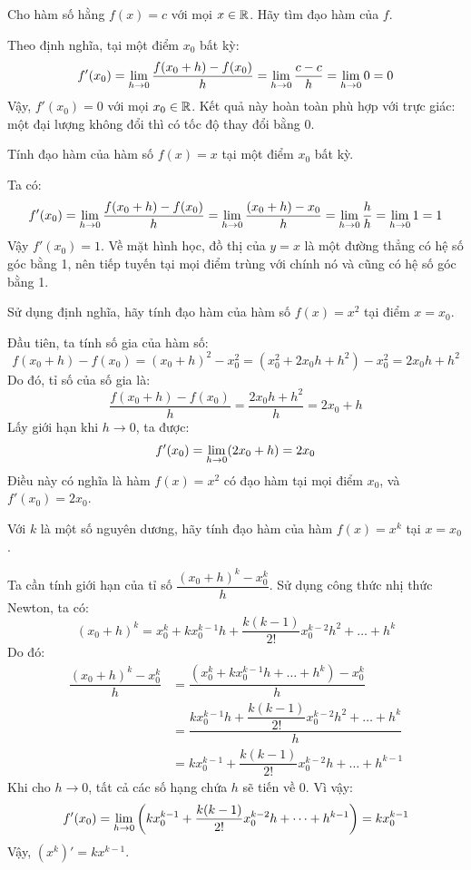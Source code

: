 \begin{example}
Cho hàm số hằng $f(x) = c$ với mọi $x \in \mathbb{R}$. Hãy tìm đạo hàm của $f$.
\end{example}
\begin{solution}
Theo định nghĩa, tại một điểm $x_0$ bất kỳ:
$$
f'(x_0) = \lim\limits_{h \to 0} \dfrac{f(x_0 + h) - f(x_0)}{h} = \lim\limits_{h \to 0} \dfrac{c - c}{h} = \lim\limits_{h \to 0} 0 = 0
$$
Vậy, $f'(x_0) = 0$ với mọi $x_0 \in \mathbb{R}$. Kết quả này hoàn toàn phù hợp với trực giác: một đại lượng không đổi thì có tốc độ thay đổi bằng 0.
\end{solution}

\begin{example}
Tính đạo hàm của hàm số $f(x) = x$ tại một điểm $x_0$ bất kỳ.
\end{example}
\begin{solution}
Ta có:
$$
f'(x_0) = \lim\limits_{h \to 0} \dfrac{f(x_0 + h) - f(x_0)}{h} = \lim\limits_{h \to 0} \dfrac{(x_0 + h) - x_0}{h} = \lim\limits_{h \to 0} \dfrac{h}{h} = \lim\limits_{h \to 0} 1 = 1
$$
Vậy $f'(x_0) = 1$. Về mặt hình học, đồ thị của $y=x$ là một đường thẳng có hệ số góc bằng 1, nên tiếp tuyến tại mọi điểm trùng với chính nó và cũng có hệ số góc bằng 1.
\end{solution}

\begin{example}
Sử dụng định nghĩa, hãy tính đạo hàm của hàm số $f(x) = x^2$ tại điểm $x=x_0$.
\end{example}
\begin{solution}
Đầu tiên, ta tính số gia của hàm số:
$$
f(x_0 + h) - f(x_0) = (x_0 + h)^2 - x_0^2 = (x_0^2 + 2x_0h + h^2) - x_0^2 = 2x_0h + h^2
$$
Do đó, tỉ số của số gia là:
$$
\dfrac{f(x_0 + h) - f(x_0)}{h} = \dfrac{2x_0h + h^2}{h} = 2x_0 + h
$$
Lấy giới hạn khi $h \to 0$, ta được:
$$
f'(x_0) = \lim\limits_{h \to 0} (2x_0 + h) = 2x_0
$$
Điều này có nghĩa là hàm $f(x) = x^2$ có đạo hàm tại mọi điểm $x_0$, và $f'(x_0) = 2x_0$.
\end{solution}

\begin{example}[Đạo hàm của hàm lũy thừa $f(x) = x^k$]
Với $k$ là một số nguyên dương, hãy tính đạo hàm của hàm $f(x) = x^k$ tại $x=x_0$.
\end{example}
\begin{solution}
Ta cần tính giới hạn của tỉ số $\dfrac{(x_0+h)^k - x_0^k}{h}$. Sử dụng công thức nhị thức Newton, ta có:
$$
(x_0+h)^k = x_0^k + kx_0^{k-1}h + \dfrac{k(k-1)}{2!}x_0^{k-2}h^2 + \dots + h^k
$$
Do đó:
\begin{align*}
\dfrac{(x_0+h)^k - x_0^k}{h} &= \dfrac{(x_0^k + kx_0^{k-1}h + \dots + h^k) - x_0^k}{h} \\
&= \dfrac{kx_0^{k-1}h + \dfrac{k(k-1)}{2!}x_0^{k-2}h^2 + \dots + h^k}{h} \\
&= kx_0^{k-1} + \dfrac{k(k-1)}{2!}x_0^{k-2}h + \dots + h^{k-1}
\end{align*}
Khi cho $h \to 0$, tất cả các số hạng chứa $h$ sẽ tiến về 0. Vì vậy:
$$
f'(x_0) = \lim\limits_{h \to 0} \left( kx_0^{k-1} + \dfrac{k(k-1)}{2!}x_0^{k-2}h + \dots + h^{k-1} \right) = kx_0^{k-1}
$$
Vậy, $(x^k)' = kx^{k-1}$.
\end{solution}


